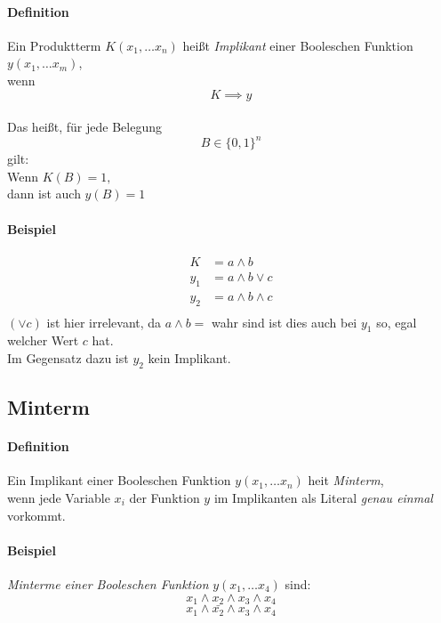 \documentclass[a4paper]{scrartcl}
\begin{document}
			\paragraph{Definition}
			Ein Produktterm \( K(x_1, \dots x_n) \) heißt \emph{Implikant} einer Booleschen Funktion \( y(x_1, \dots x_m) \), \\
			wenn \[ K \implies y \] \\
			Das heißt, für jede Belegung  \[B \in \{ 0, 1 \}^n \] gilt:\\
			Wenn \( K(B ) = 1, \)\\
			dann ist auch \( y(B) = 1 \)\\
			
			\paragraph{Beispiel}
			\begin{align*}
				K &= a \wedge b \\
				y_1 &= a \wedge b \vee c\\
				y_2 &= a \wedge b \wedge c\\
			\end{align*}
			\( (\vee c )\) ist hier irrelevant, da \( a \wedge b = \) wahr sind ist dies auch bei \(y_1 \) so, egal welcher Wert \( c \) hat. \\
			Im Gegensatz dazu ist \( y_2 \) kein Implikant.\\
			
			\subsection{Minterm}
			\paragraph{Definition}
			Ein Implikant einer Booleschen Funktion \( y(x_1, \dots x_n) \) heit \emph{Minterm},\\
			wenn jede Variable \( x_i \) der Funktion \(y\) im Implikanten als Literal \emph{genau einmal} vorkommt.
			
			\paragraph{Beispiel}
			\emph{Minterme einer Booleschen Funktion } \( y(x_1, \dots x_4) \) sind:\\
			\[ x_1 \wedge x_2 \wedge x_3 \wedge x_4 \]
			\[ x_1 \wedge \bar{x_2} \wedge x_3 \wedge x_4 \]
			
\end{document}

